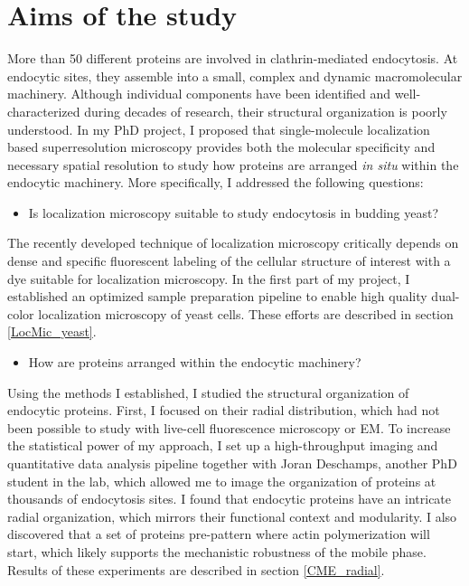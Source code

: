 
\chapter{Aims of the study} %

\label{Ch:Aims} %

More than 50 different proteins are involved in clathrin-mediated endocytosis. At endocytic sites, they assemble into a small, complex and dynamic macromolecular machinery. Although individual components have been identified and well-characterized during decades of research, their structural organization is poorly understood. In my PhD project, I proposed that single-molecule localization based superresolution microscopy provides both the molecular specificity and necessary spatial resolution to study how proteins are arranged \textit{in situ} within the endocytic machinery. More specifically, I addressed the following questions:

\begin{itemize}
	\item Is localization microscopy suitable to study endocytosis in budding yeast?
\end{itemize}

The recently developed technique of localization microscopy critically depends on dense and specific fluorescent labeling of the cellular structure of interest with a dye suitable for localization microscopy. In the first part of my project, I established an optimized sample preparation pipeline to enable high quality dual-color localization microscopy of yeast cells. These efforts are described in section \ref{LocMic_yeast}.

\begin{itemize}
	\item How are proteins arranged within the endocytic machinery?
\end{itemize}

Using the methods I established, I studied the structural organization of endocytic proteins. First, I focused on their radial distribution, which had not been possible to study with live-cell fluorescence microscopy or EM. To increase the statistical power of my approach, I set up a high-throughput imaging and quantitative data analysis pipeline together with Joran Deschamps, another PhD student in the lab, which allowed me to image the organization of proteins at thousands of endocytosis sites. I found that endocytic proteins have an intricate radial organization, which mirrors their functional context and modularity. I also discovered that a set of proteins pre-pattern where actin polymerization will start, which likely supports the mechanistic robustness of the mobile phase. Results of these experiments are described in section \ref{CME_radial}.

